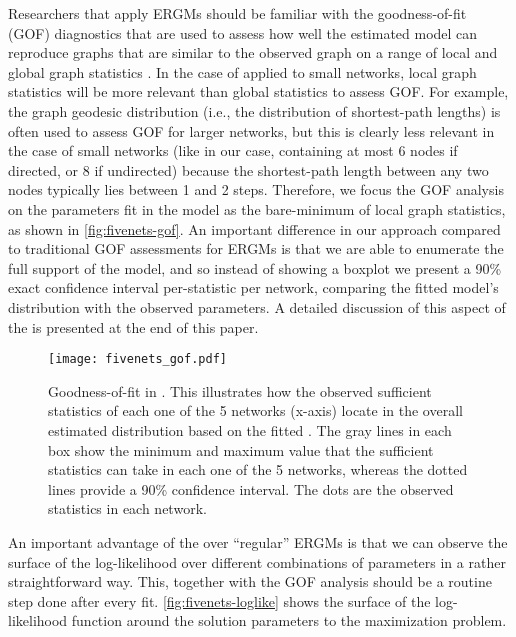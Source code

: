 \documentclass[review]{elsarticle}
\begin{document}
Researchers that apply ERGMs should be familiar with the goodness-of-fit (GOF) diagnostics that are used to assess how well the estimated model can reproduce graphs that are similar to the observed graph on a range of local and global graph statistics \cite{Hunteretal2008}. In the case of \ergmitos{} applied to small networks, local graph statistics will be more relevant than global statistics to assess GOF. For example, the graph geodesic distribution (i.e., the distribution of shortest-path lengths) is often used to assess GOF for larger networks, but this is clearly less relevant in the case of small networks (like in our case, containing at most 6 nodes if directed, or 8 if undirected) because the shortest-path length between any two nodes typically lies between 1 and 2 steps. Therefore, we focus the GOF analysis on the parameters fit in the model as the bare-minimum of local graph statistics, as shown in \autoref{fig:fivenets-gof}. An important difference in our approach compared to traditional GOF assessments for ERGMs is that we are able to enumerate the full support of the model, and so instead of showing a boxplot we present a 90\% exact confidence interval per-statistic per network, comparing the fitted model's distribution with the observed parameters. A detailed discussion of this aspect of the \ergmitos{} is presented at the end of this paper.

\begin{figure}[tb]
    \centering
    \caption{Goodness-of-fit in \ergmitos{}. This illustrates how the observed sufficient statistics of each one of the 5 networks (x-axis) locate in the overall estimated distribution based on the fitted \ergmito{}. The gray lines in each box show the minimum and maximum value that the sufficient statistics can take in each one of the 5 networks, whereas the dotted lines provide a 90\% confidence interval. The dots are the observed statistics in each network.}
    \texttt{[image: fivenets\_gof.pdf]}
    \label{fig:fivenets-gof}
\end{figure}

An important advantage of the \ergmitos{} over ``regular'' ERGMs is that we can observe the surface of the log-likelihood over different combinations of parameters in a rather straightforward way. This, together with the GOF analysis should be a routine step done after every \ergmito{} fit. \autoref{fig:fivenets-loglike} shows the surface of the log-likelihood function around the solution parameters to the maximization problem.
\end{document}
